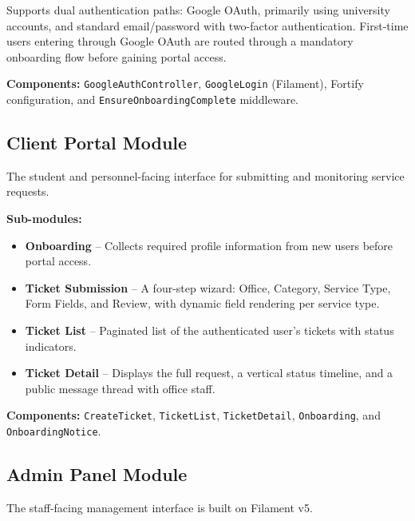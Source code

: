 \documentclass[12pt,a4paper]{article}
\newcommand{\code}[1]{\texttt{#1}}
\begin{document}
Supports dual authentication paths: Google OAuth, primarily using university accounts, and standard email/password with two-factor authentication. First-time users entering through Google OAuth are routed through a mandatory onboarding flow before gaining portal access.

\textbf{Components:} \code{GoogleAuthController}, \code{GoogleLogin} (Filament), Fortify configuration, and \code{EnsureOnboardingComplete} middleware.

\subsection{Client Portal Module}

The student and personnel-facing interface for submitting and monitoring service requests.

\textbf{Sub-modules:}
\begin{itemize}
    \item \textbf{Onboarding} -- Collects required profile information from new users before portal access.
    \item \textbf{Ticket Submission} -- A four-step wizard: Office, Category, Service Type, Form Fields, and Review, with dynamic field rendering per service type.
    \item \textbf{Ticket List} -- Paginated list of the authenticated user's tickets with status indicators.
    \item \textbf{Ticket Detail} -- Displays the full request, a vertical status timeline, and a public message thread with office staff.
\end{itemize}

\textbf{Components:} \code{CreateTicket}, \code{TicketList}, \code{TicketDetail}, \code{Onboarding}, and \code{OnboardingNotice}.

\subsection{Admin Panel Module}

The staff-facing management interface is built on Filament v5.
\end{document}
